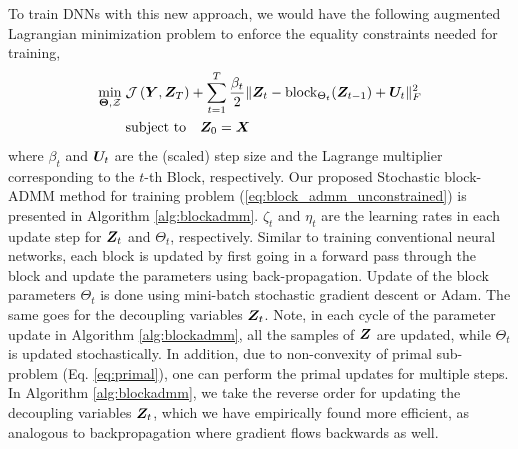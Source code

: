 To train DNNs with this new approach, 
we would have the following augmented Lagrangian minimization problem to enforce the equality constraints needed for training,
\begin{align} \label{eq:block_admm_unconstrained}
	\min_{ {\bf \Theta}, \mathcal{Z}} \; &\mathcal{J}\left({\bm{Y}}, {\bm{Z}}_{T} \right) 
	+ \sum_{t=1}^{T} \frac{\beta_t}{2} \| {\bm{Z}}_t - \mathrm{block}_{\Theta_t}({\bm{Z}}_{t-1}) + {\bm{U}}_t\|_F^2 \nonumber \\
	& {\rm subject~to} \quad {\bm{Z}}_{0} = {\bm{X}} 
\end{align}
where $\beta_t$ and ${\bm{U}}_t$ are the (scaled) step size  and the Lagrange multiplier corresponding to the $t$-th Block, respectively. Our proposed Stochastic block-ADMM method for training problem (\ref{eq:block_admm_unconstrained}) is presented in Algorithm \ref{alg:blockadmm}. %
$\zeta_t$ and $\eta_t$ are the learning rates in each update step for ${\bm{Z}}_t$ and $\Theta_t$, respectively. Similar to training conventional neural networks, each block is updated by first going in a forward pass through the block and update the parameters using back-propagation. Update of the block parameters $\Theta_{t}$ is done using mini-batch stochastic gradient descent or Adam. The same goes for the decoupling variables ${\bm{Z}}_t$. Note, in each cycle of the parameter update in Algorithm \ref{alg:blockadmm}, all the samples of ${\bm{Z}}$ are updated, while $\Theta_{t}$ is updated stochastically. In addition, due to non-convexity of primal sub-problem (Eq. \ref{eq:primal}), one can perform the primal updates for multiple steps. %
In Algorithm \ref{alg:blockadmm}, we take the reverse order for updating  the decoupling variables ${\bm{Z}}_t$, which we have empirically found more efficient, as analogous to backpropagation where gradient flows backwards as well.


